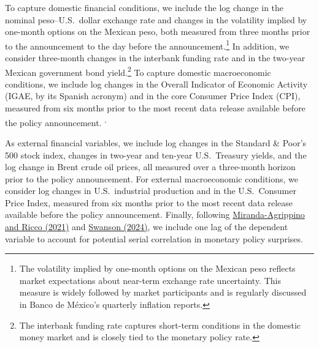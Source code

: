 \documentclass[12pt, reqno]{article}
\begin{document}
To capture domestic financial conditions, we include the log change in the nominal peso--U.S.\ dollar exchange rate and changes in the volatility implied by one-month options on the Mexican peso, both measured from three months prior to the announcement to the day before the announcement.\footnote{The volatility implied by one-month options on the Mexican peso reflects market expectations about near-term exchange rate uncertainty. This measure is widely followed by market participants and is regularly discussed in Banco de México’s quarterly inflation reports.} In addition, we consider three-month changes in the interbank funding rate and in the two-year Mexican government bond yield.\footnote{The interbank funding rate captures short-term conditions in the domestic money market and is closely tied to the monetary policy rate.}  To capture domestic macroeconomic conditions, we include log changes in the Overall Indicator of Economic Activity (IGAE, by its Spanish acronym) and in the core Consumer Price Index (CPI), measured from six months prior to the most recent data release available before the policy announcement.\footnotemark
{}\textsuperscript{,}\footnotemark
{}

As external financial variables, we include log changes in the Standard \& Poor’s 500 stock index, changes in two-year and ten-year U.S.\ Treasury yields, and the log change in Brent crude oil prices, all measured over a three-month horizon prior to the policy announcement. For external macroeconomic conditions, we consider log changes in U.S.\ industrial production and in the U.S.\ Consumer Price Index, measured from six months prior to the most recent data release available before the policy announcement. Finally, following \hyperlink{Miranda-Agrippino and Ricco (2021)}{Miranda-Agrippino and Ricco (2021)} and \hyperlink{Swanson (2024)}{Swanson (2024)}, we include one lag of the dependent variable to account for potential serial correlation in monetary policy surprises.
\end{document}
